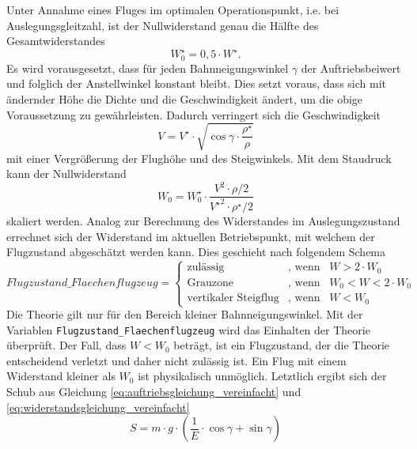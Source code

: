 Unter Annahme eines Fluges im optimalen Operationspunkt, i.e. bei Auslegungsgleitzahl, ist der Nullwiderstand genau die Hälfte des Gesamtwiderstandes \cite[S.82-S.83]{Bruning.1986}
\begin{equation}
	W_0^\star = 0,5\cdot W^\star .
\end{equation}
Es wird vorausgesetzt, dass für jeden Bahnneigungswinkel \ensuremath{\gamma} der Auftriebsbeiwert und folglich der Anstellwinkel konstant bleibt. Dies setzt voraus, dass sich mit ändernder Höhe die Dichte und die Geschwindigkeit ändert, um die obige Voraussetzung zu gewährleisten. Dadurch verringert sich die Geschwindigkeit 
\begin{equation}
	V = V^\star\cdot\sqrt{\cos\gamma\cdot\frac{\rho^\star}{\rho}}  \label{eq:geschw_flaechenflugzeug}
\end{equation}
mit einer Vergrößerung der Flughöhe und des Steigwinkels. Mit dem Staudruck kann der Nullwiderstand 
\begin{equation}
	W_0 = W_0^\star\cdot\frac{V^2\cdot\rho/2}{{V^\star}^2\cdot\rho^\star/2}
\end{equation}
skaliert werden.
Analog zur Berechnung des Widerstandes im Auslegungszustand errechnet sich der Widerstand im aktuellen Betriebspunkt, mit welchem der Flugzustand abgeschätzt werden kann. Dies geschieht nach folgendem Schema
\begin{equation}
Flugzustand\_Flaechenflugzeug = \begin{cases} 
\text{zulässig} & \text{, wenn} \;\;\; W > 2\cdot W_0 \\ 
\text{Grauzone} & \text{, wenn} \;\;\; W_0 < W < 2\cdot W_0 \\ 
\text{vertikaler Steigflug}  & \text{, wenn} \;\;\; W < W_0 
\end{cases}
\end{equation} 
Die Theorie gilt nur für den Bereich kleiner Bahnneigungswinkel. Mit der Variablen \texttt{Flugzustand\_Flaechenflugzeug} wird das Einhalten der Theorie überprüft. Der Fall, dass \ensuremath{W < W_0} beträgt, ist ein Flugzustand, der die Theorie entscheidend verletzt und daher nicht zulässig ist. Ein Flug mit einem Widerstand kleiner als \ensuremath{W_0} ist physikalisch unmöglich.
Letztlich ergibt sich der Schub aus Gleichung \ref{eq:auftriebsgleichung_vereinfacht} und \ref{eq:widerstandsgleichung_vereinfacht}
\begin{equation}
	S = m\cdot g\cdot (\frac{1}{E}\cdot\cos\gamma + \sin\gamma) \label{eq:schub_flaechenflugzeug}
\end{equation}
